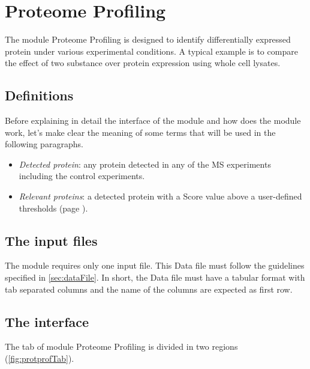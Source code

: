 \chapter{Proteome Profiling}
\label{chap:protprof}

The module Proteome Profiling is designed to identify differentially expressed
protein under various experimental conditions. A typical example is to compare the
effect of two substance over protein expression using whole cell lysates.

\section{Definitions}

Before explaining in detail the interface of the module and how does the module work, 
let's make clear the meaning of some terms that will be used in the following paragraphs.

\begin{itemize}
    \item \textit{Detected protein}: any protein detected in any of the MS
    experiments including the control experiments.
    \item \textit{Relevant proteins}: a detected protein with a Score value above
    a user-defined thresholds (page \pageref{par:protprofScoreValue}).
\end{itemize}

\section{The input files}

The module requires only one input file. This Data file must follow
the guidelines specified in \autoref{sec:dataFile}. In short, the Data file must
have a tabular format with tab separated columns and the name of the columns are
expected as first row.

\section{The interface}

The tab of module Proteome Profiling is divided in two regions (\autoref{fig:protprofTab}).

